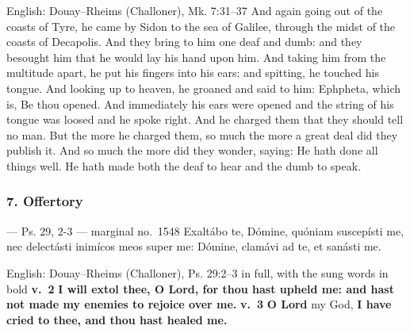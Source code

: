 \begin{namedtranslation}{English: Douay--Rheims (Challoner), Mk. 7:31--37}
And again going out of the coasts of Tyre, he came by Sidon to the sea of
Galilee, through the midst of the coasts of Decapolis. And they bring to him
one deaf and dumb: and they besought him that he would lay his hand upon him.
And taking him from the multitude apart, he put his fingers into his ears:
and spitting, he touched his tongue. And looking up to heaven, he groaned and
said to him: Ephpheta, which is, Be thou opened. And immediately his ears were
opened and the string of his tongue was loosed and he spoke right. And he
charged them that they should tell no man. But the more he charged them, so
much the more a great deal did they publish it. And so much the more did they
wonder, saying: He hath done all things well. He hath made both the deaf to
hear and the dumb to speak.
\end{namedtranslation}



\elementguard
\subsubsection*{7. Offertory }

\begin{appointedlatin}{ --- Ps. 29, 2-3 --- marginal no.\ 1548}
Exaltábo te, Dómine, quóniam suscepísti me, nec delectásti inimícos meos super
me: Dómine, clamávi ad te, et sanásti me.
\end{appointedlatin}

\begin{namedtranslation}{English: Douay--Rheims (Challoner), Ps. 29:2--3 in full, with the sung words in bold}
\textbf{v.~2} \textbf{I will extol thee, O Lord, for thou hast upheld me: and
hast not made my enemies to rejoice over me.} \textbf{v.~3} \textbf{O Lord} my
God, \textbf{I have cried to thee, and thou hast healed me.}
\end{namedtranslation}

